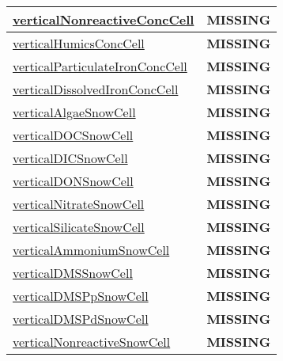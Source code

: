 {\begin{center}
\begin{longtable}{| p{2.0in} | p{4.0in} |}
    \hline
    \hyperref[subsec:var_sec_tracers_aggregate_verticalNonreactiveConcCell]{verticalNonreactiveConcCell} & {\bf \color{red} MISSING} \\
    \hline
    \hyperref[subsec:var_sec_tracers_aggregate_verticalHumicsConcCell]{verticalHumicsConcCell} & {\bf \color{red} MISSING} \\
    \hline
    \hyperref[subsec:var_sec_tracers_aggregate_verticalParticulateIronConcCell]{verticalParticulateIronConcCell} & {\bf \color{red} MISSING} \\
    \hline
    \hyperref[subsec:var_sec_tracers_aggregate_verticalDissolvedIronConcCell]{verticalDissolvedIronConcCell} & {\bf \color{red} MISSING} \\
    \hline
    \hyperref[subsec:var_sec_tracers_aggregate_verticalAlgaeSnowCell]{verticalAlgaeSnowCell} & {\bf \color{red} MISSING} \\
    \hline
    \hyperref[subsec:var_sec_tracers_aggregate_verticalDOCSnowCell]{verticalDOCSnowCell} & {\bf \color{red} MISSING} \\
    \hline
    \hyperref[subsec:var_sec_tracers_aggregate_verticalDICSnowCell]{verticalDICSnowCell} & {\bf \color{red} MISSING} \\
    \hline
    \hyperref[subsec:var_sec_tracers_aggregate_verticalDONSnowCell]{verticalDONSnowCell} & {\bf \color{red} MISSING} \\
    \hline
    \hyperref[subsec:var_sec_tracers_aggregate_verticalNitrateSnowCell]{verticalNitrateSnowCell} & {\bf \color{red} MISSING} \\
    \hline
    \hyperref[subsec:var_sec_tracers_aggregate_verticalSilicateSnowCell]{verticalSilicateSnowCell} & {\bf \color{red} MISSING} \\
    \hline
    \hyperref[subsec:var_sec_tracers_aggregate_verticalAmmoniumSnowCell]{verticalAmmoniumSnowCell} & {\bf \color{red} MISSING} \\
    \hline
    \hyperref[subsec:var_sec_tracers_aggregate_verticalDMSSnowCell]{verticalDMSSnowCell} & {\bf \color{red} MISSING} \\
    \hline
    \hyperref[subsec:var_sec_tracers_aggregate_verticalDMSPpSnowCell]{verticalDMSPpSnowCell} & {\bf \color{red} MISSING} \\
    \hline
    \hyperref[subsec:var_sec_tracers_aggregate_verticalDMSPdSnowCell]{verticalDMSPdSnowCell} & {\bf \color{red} MISSING} \\
    \hline
    \hyperref[subsec:var_sec_tracers_aggregate_verticalNonreactiveSnowCell]{verticalNonreactiveSnowCell} & {\bf \color{red} MISSING} \\

\end{longtable}
\end{center}}

